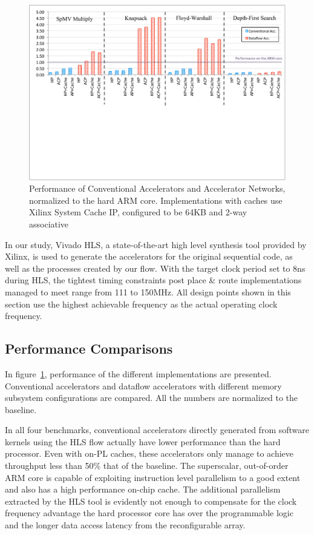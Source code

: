 \documentclass{sig-alternate}
\begin{document}
\begin{figure}[htp]
\begin{center}
\includegraphics[width=0.95\linewidth]{fig/perf.pdf}
\caption{Performance of Conventional Accelerators and Accelerator Networks, normalized to the hard ARM core. Implementations with caches use
Xilinx System Cache IP, configured to be 64KB and 2-way associative   
\label{fig:acpraw}}
\end{center}
\vspace{-2.7em}
\end{figure} 


In our study, Vivado HLS, a state-of-the-art high level synthesis tool provided by Xilinx,
is used to generate the accelerators for the original sequential code, as well as the processes created by our flow. With the target clock period set to 
8ns during HLS, the tightest timing constraints post place \& route implementations managed to meet range from 111 to 150MHz. 
All design points shown in this section 
use the highest achievable frequency as the actual operating clock frequency. 
\subsection{Performance Comparisons}
In figure~\ref{fig:acpraw}, 
performance of the different implementations are presented. 
Conventional accelerators and dataflow accelerators with different memory subsystem
configurations are compared. All the numbers are normalized to the baseline.

In all four benchmarks, conventional accelerators directly generated from software kernels using the HLS flow
actually have lower performance than the hard processor. Even with
on-PL caches, 
these accelerators only manage to achieve throughput less than 50\% that of the baseline. 
The superscalar, 
out-of-order ARM core is capable of exploiting instruction level parallelism to a good extent 
and also has a high performance on-chip cache.
The additional parallelism extracted by the HLS tool is evidently not enough
to compensate for the clock frequency advantage the hard processor core has over the programmable logic and the longer data access
latency from the reconfigurable array. 
\end{document}
